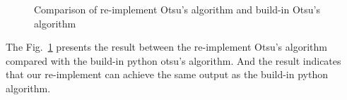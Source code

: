 \documentclass[12pt]{article}
\begin{document}
\begin{enumerate}[1]
\begin{enumerate}
\begin{figure}[H]
        \quad
        \caption{Comparison of re-implement Otsu's algorithm and build-in Otsu's algorithm}
        \label{Q3_a}
    \end{figure}

The Fig.~\ref{Q3_a} presents the result between the re-implement Otsu's algorithm compared with the build-in python otsu's algorithm. 
And the result indicates that our re-implement can achieve the same output as the build-in python algorithm.



\end{enumerate}
\end{enumerate}
\end{document}
